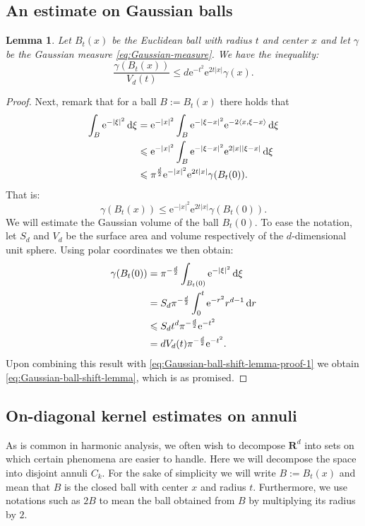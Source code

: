 \documentclass[a4paper,oneside,10pt]{amsproc}
\theoremstyle{plain}
\newtheorem{lemma}{Lemma}
\theoremstyle{remark}
\theoremstyle{definition}
\newcommand{\D}{\,\textup{d}}
\newcommand{\la}{\langle}
\newcommand{\ra}{\rangle}
\renewcommand{\leq}{\leqslant}
\renewcommand{\leq}{\leqslant}
\newcommand{\R}{\mathbf R}
\newcommand{\e}{\mathrm{e}} %
\renewcommand{\leq}{\leqslant}%
\begin{document}
\subsection{An estimate on Gaussian balls}
\begin{lemma}\label{lem:Gaussian-ball-shift-lemma}
  Let $B_t(x)$ be the Euclidean ball with radius $t$ and center $x$
  and let $\gamma$ be the Gaussian measure
  \eqref{eq:Gaussian-measure}. We have the inequality:
  \begin{equation}\label{eq:Gaussian-ball-shift-lemma}
    \frac{\gamma(B_t(x))}{V_d(t)} \leq d \e^{-t^2} \e^{2 t |x|} \gamma(x).
  \end{equation}
\end{lemma}
\begin{proof}
    Next, remark that for a ball $B:= B_t(x)$ there holds that
  \begin{align*}
    \int_B \e^{-|\xi|^2} \D\xi &= \e^{-|x|^2} \int_{B} \e^{-|\xi -
      x|^2} \e^{-2 \la x, \xi - x \ra} \D\xi\\
    &\leq \e^{-|x|^2} \int_{B} \e^{-|\xi - x|^2} \e^{2 |x| |\xi - x|}
    \D\xi\\
    &\leq \pi^{\frac{d}2} \e^{-|x|^2} \e^{2 t |x|} \gamma(B_t(0)).
  \end{align*}
  That is:
  \begin{equation}\label{eq:Gaussian-ball-shift-lemma-proof-1}
    \gamma(B_t(x)) \leq \e^{-|x|^2} \e^{2 t |x|} \gamma(B_t(0)).
  \end{equation}
  We will estimate the Gaussian volume of the ball $B_t(0)$. To ease
  the notation, let $S_d$ and $V_d$ be the surface area and volume
  respectively of the $d$-dimensional unit sphere. Using polar coordinates
  we then obtain: 
  \begin{align*}
    \gamma(B_t(0)) &= \pi^{-\frac{d}2} \int_{B_t(0)} \e^{-|\xi|^2} \D\xi\\
    &= S_d \pi^{-\frac{d}2} \int_0^t \e^{-r^2} r^{d - 1} \D{r}\\
    &\leq S_d t^d \pi^{-\frac{d}2}\e^{-t^2}\\
    &= d V_d(t) \pi^{-\frac{d}2}\e^{-t^2}.
  \end{align*}
  Upon combining this result with
  \eqref{eq:Gaussian-ball-shift-lemma-proof-1} we obtain
  \eqref{eq:Gaussian-ball-shift-lemma}, which is as promised.
\end{proof}

\subsection{On-diagonal kernel estimates on annuli}
As is common in harmonic analysis, we often wish to decompose
$\R^d$ into sets on which certain phenomena are easier to handle. Here
we will decompose the space into disjoint annuli $C_k$. For the sake
of simplicity we will write $B := B_t(x)$ and mean that $B$ is the
closed ball with center $x$ and radius $t$. Furthermore, we use
notations such as $2B$ to mean the ball obtained from $B$ by
multiplying its radius by $2$.
\end{document}

